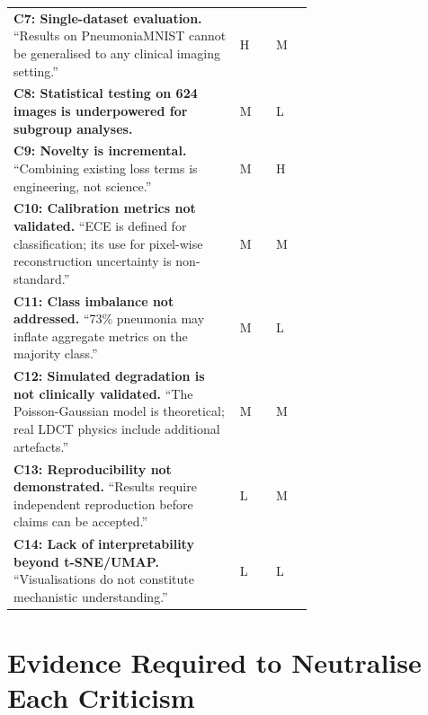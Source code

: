 \documentclass[12pt, a4paper]{article}
\begin{document}
\begin{longtable}{p{0.5\linewidth} p{0.08\linewidth} p{0.08\linewidth}}
\addlinespace
\textbf{C7: Single-dataset evaluation.}
``Results on PneumoniaMNIST cannot be generalised to any
clinical imaging setting.''
& H & M \\

\addlinespace
\textbf{C8: Statistical testing on 624 images is underpowered
for subgroup analyses.}
& M & L \\

\addlinespace
\textbf{C9: Novelty is incremental.}
``Combining existing loss terms is engineering, not science.''
& M & H \\

\addlinespace
\textbf{C10: Calibration metrics not validated.}
``ECE is defined for classification; its use for pixel-wise
reconstruction uncertainty is non-standard.''
& M & M \\

\addlinespace
\textbf{C11: Class imbalance not addressed.}
``73\% pneumonia may inflate aggregate metrics on the
majority class.''
& M & L \\

\addlinespace
\textbf{C12: Simulated degradation is not clinically validated.}
``The Poisson-Gaussian model is theoretical; real LDCT
physics include additional artefacts.''
& M & M \\

\addlinespace
\textbf{C13: Reproducibility not demonstrated.}
``Results require independent reproduction before claims
can be accepted.''
& L & M \\

\addlinespace
\textbf{C14: Lack of interpretability beyond t-SNE/UMAP.}
``Visualisations do not constitute mechanistic understanding.''
& L & L \\

\bottomrule
\end{longtable}

\section{Evidence Required to Neutralise Each Criticism}
\end{document}
